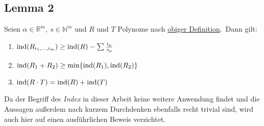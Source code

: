     \subsection{Lemma 2}
        \label{subsec:lemma2}
        Seien $\alpha \in \mathbb{R}^m,\ s \in \mathbb{N}^m$ und $R$ und $T$ Polynome nach \hyperref
        [subsubsec:def-poly]{obiger Definition}.\ Dann gilt:
        \begin{enumerate}
            \item $\operatorname{ind}(R_{i_1, \dots, i_m}) \geq \operatorname{ind}(R) - \sum \frac{i_\mu}{s_\mu}$
            \item $\operatorname{ind}(R_1 + R_2) \geq \min \{ \operatorname{ind}(R_1), \operatorname{ind}(R_2) \}$
            \item $\operatorname{ind}(R \cdot T) = \operatorname{ind}(R) +\operatorname{ind}(T)$
        \end{enumerate}
        \textrm{Da der Begriff des \emph{Index} in dieser Arbeit keine weitere Anwendung findet und die Aussagen
        außerdem nach kurzem Durchdenken ebenfalls recht trivial sind, wird auch hier auf einen ausführlichen Beweis
        verzichtet.}
    
